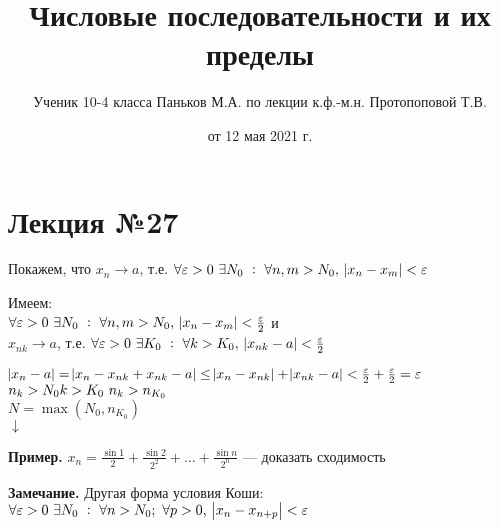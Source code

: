 \documentclass{article}
\begin{document}
    \title{Числовые последовательности и их пределы}
    \author{Ученик 10-4 класса Паньков М.А. по лекции к.ф.-м.н. Протопоповой Т.В.}
    \date{от 12 мая 2021 г.}
    \maketitle

    \section{Лекция №27}

    Покажем, что \( x_n \rightarrow a \), т.е. \(\forall \varepsilon > 0\ \exists N_0\ :\ \forall n, m > N_0,\ \abs{x_n - x_m} < \varepsilon \)

    Имеем:\\
    \(\forall \varepsilon > 0\ \exists N_0\ :\ \forall n, m > N_0,\ \abs{x_n - x_m} < \frac{\varepsilon}{2}\) и\\
    \(x_{nk} \rightarrow a\), т.е. \(\forall \varepsilon > 0\ \exists K_0\ :\ \forall k > K_0,\ \abs{x_{nk} - a} < \frac{\varepsilon}{2}\)

    \(\abs{x_n - a} = \abs{x_n - x_{nk} + x_{nk} - a} \leq \abs{x_n - x_{nk}} + \abs{x_{nk} - a} < \frac{\varepsilon}{2} + \frac{\varepsilon}{2} = \varepsilon\)
    \\ \(n_k > N_0\\ k > K_0\ n_k > n_{K_0}\)
    \\\(N = \max(N_0, n_{K_0})\)
    \\\(\downarrow\)
    
    \textbf{Пример.} \(x_n = \frac{\sin{1}}{2} + \frac{\sin{2}}{2^2} + ... + \frac{\sin{n}}{2^n}\) --- доказать сходимость

    \quad \quad \textbf{Замечание.} Другая форма условия Коши: \(\forall \varepsilon > 0\ \exists N_0\ :\ \forall n > N_0;\ \forall p > 0,\ \abs{x_n - x_{n+p}} < \varepsilon\)
\end{document}
